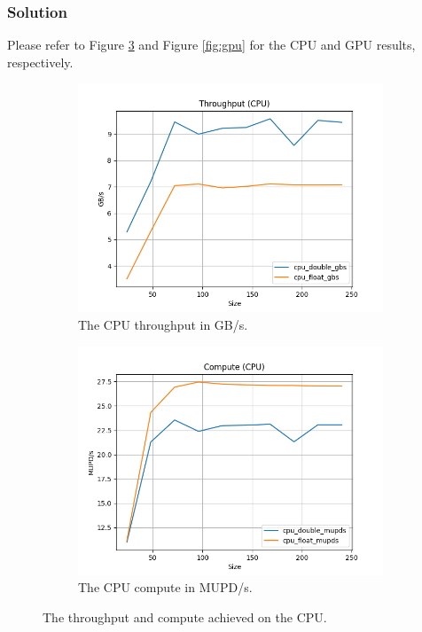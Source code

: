 \documentclass[10pt]{article}
\begin{document}
\subsubsection{Solution}
Please refer to Figure \ref{fig:cpu} and Figure \ref{fig:gpu} for the CPU and GPU results, respectively.
\begin{figure}[!ht]
        \centering
    \begin{subfigure}[b]{0.49\textwidth}
        \centering
        \includegraphics[width=\linewidth]{figs/cpu_gbs.png}
        \caption{The CPU throughput in GB/s.}
        \label{fig:cpu_gbs}
    \end{subfigure}\hfill
    \begin{subfigure}[b]{0.49\textwidth}
        \centering
        \includegraphics[width=\linewidth]{figs/cpu_mupds.png}
        \caption{The CPU compute in MUPD/s.}
        \label{fig:cpu_mupds}
    \end{subfigure}\hfill
    \caption{The throughput and compute achieved on the CPU.}
    \label{fig:cpu}
\end{figure}
\end{document}

